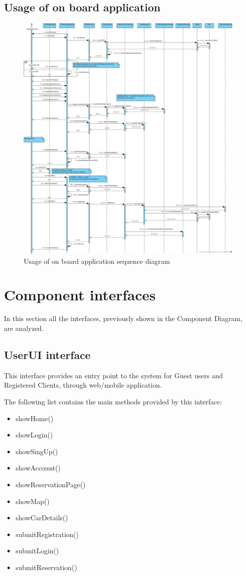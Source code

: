 \subsection{Usage of on board application}
\begin{figure}[H]
\includegraphics[width=\textwidth, keepaspectratio]{../images/architectural_design/rv_onboard.png}
\caption{Usage of on board application sequence diagram}
\end{figure}

\section{Component interfaces}
In this section all the interfaces, previously shown in the Component Diagram, are analyzed.

\subsection{UserUI interface}
This interface provides an entry point to the system for Guest users and Registered Clients, through web/mobile application.

The following list contains the main methods provided by this interface:
\begin{itemize}
\item showHome()
\item showLogin()
\item showSingUp()
\item showAccount()
\item showReservationPage()
\item showMap()
\item showCarDetails()
\item submitRegistration()
\item submitLogin()
\item submitReservation()
\end{itemize}

